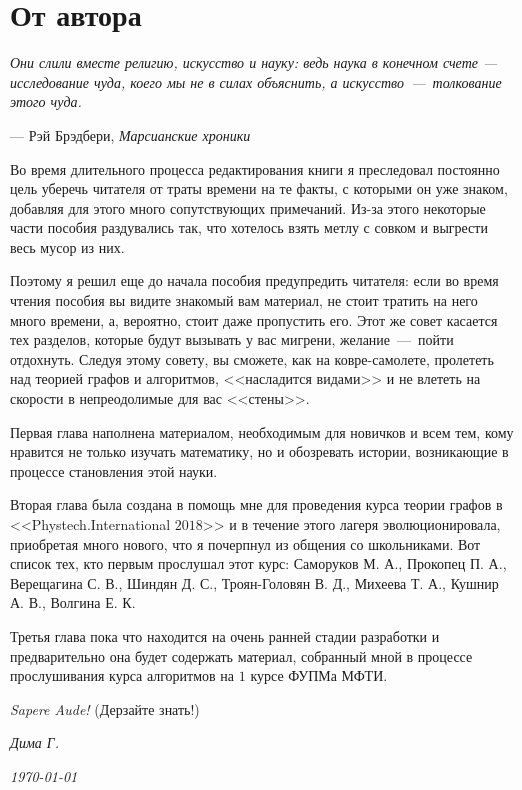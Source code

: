 \sloppy
\chapter*{От автора}

\epigraph{\itshape Они слили вместе религию, искусство и науку: 
ведь наука в конечном счете --- исследование чуда, коего мы не в силах объяснить,
а искусство~---~толкование этого чуда.}{--- Рэй Брэдбери, \textit{Марсианские хроники}}

	Во время длительного процесса редактирования книги я преследовал постоянно цель 
	уберечь читателя от траты времени на те факты, с которыми он уже знаком, добавляя для этого много сопутствующих примечаний. 
	Из-за этого некоторые части пособия раздувались так, что хотелось взять метлу с совком и выгрести весь мусор из них. 
	
	Поэтому я решил еще до начала пособия предупредить читателя: если во время чтения пособия 
	вы видите знакомый вам материал, не стоит тратить на него много времени, а, вероятно, стоит даже пропустить его. 
	Этот же совет касается тех разделов, которые будут вызывать у вас мигрени, желание~---~пойти отдохнуть. 
	Следуя этому совету, вы сможете, как на ковре-самолете, пролететь над теорией графов и алгоритмов, 
	<<насладится видами>> и не влететь на скорости в непреодолимые для вас <<стены>>.
	
	Первая глава наполнена материалом, необходимым для новичков и всем тем, 
	кому нравится не только изучать математику, но и обозревать истории, возникающие в процессе становления этой науки.
	
	Вторая глава была создана в помощь мне для проведения курса теории графов в <<Phystech.International $2018$>> 
	и в течение этого лагеря эволюционировала, приобретая много нового, что я почерпнул из общения со школьниками.
	Вот список тех, кто первым прослушал этот курс: Саморуков М. А., Прокопец П. А., Верещагина С. В., Шиндян Д. С.,
	Троян-Головян В. Д., Михеева Т. А., Кушнир А. В., Волгина Е. К.
	
	Третья глава пока что находится на очень ранней стадии разработки и предварительно она будет содержать материал, 
	собранный мной в процессе прослушивания курса алгоритмов на $1$ курсе ФУПМа МФТИ.
	
	\emph{Sapere Aude!} (Дерзайте знать!)

\begin{flushright}
\textit{Дима Г.}

\textit{\today}
\end{flushright}